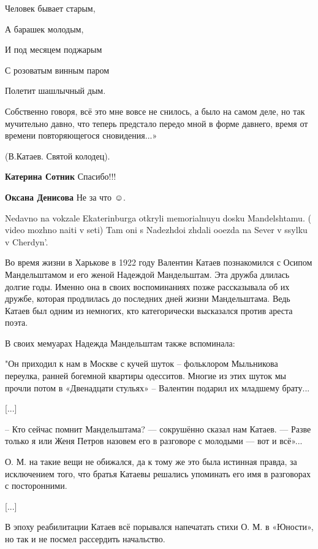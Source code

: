 \begin{itemize}
Человек бывает старым,

А барашек молодым,

И под месяцем поджарым

С розоватым винным паром

Полетит шашлычный дым.

Собственно говоря, всё это мне вовсе не снилось, а было на самом деле, но так
мучительно давно, что теперь предстало передо мной в форме давнего, время от
времени повторяющегося сновидения...»

(В.Катаев. Святой колодец).

\begin{itemize} %
\textbf{Катерина Сотник} Спасибо!!!

\textbf{Оксана Денисова}
Не за что ☺.
\end{itemize} %


Nedavno na vokzale Ekaterinburga otkryli memorialnuyu dosku Mandelshtamu. (
video mozhno naiti v seti) Tam oni s Nadezhdoi zhdali ooezda na Sever v ssylku
v Cherdyn'.


Во время жизни в Харькове в 1922 году Валентин Катаев познакомился с Осипом
Мандельштамом и его женой Надеждой Мандельштам. Эта дружба длилась долгие годы.
Именно она в своих воспоминаниях позже рассказывала об их дружбе, которая
продлилась до последних дней жизни Мандельштама. Ведь Катаев был одним из
немногих, кто категорически высказался против ареста поэта.

В своих мемуарах Надежда Мандельштам также вспоминала:

"Он приходил к нам в Москве с кучей шуток – фольклором Мыльникова переулка,
ранней богемной квартиры одесситов. Многие из этих шуток мы прочли потом в
«Двенадцати стульях» – Валентин подарил их младшему брату...

[...]

– Кто сейчас помнит Мандельштама? — сокрушённо сказал нам Катаев. — Разве
только я или Женя Петров назовем его в разговоре с молодыми — вот и всё»...


О. М. на такие вещи не обижался, да к тому же это была истинная правда, за
исключением того, что братья Катаевы решались упоминать его имя в разговорах с
посторонними.

[...]

В эпоху реабилитации Катаев всё порывался напечатать стихи О. М. в «Юности», но
так и не посмел рассердить начальство.


\end{itemize}

